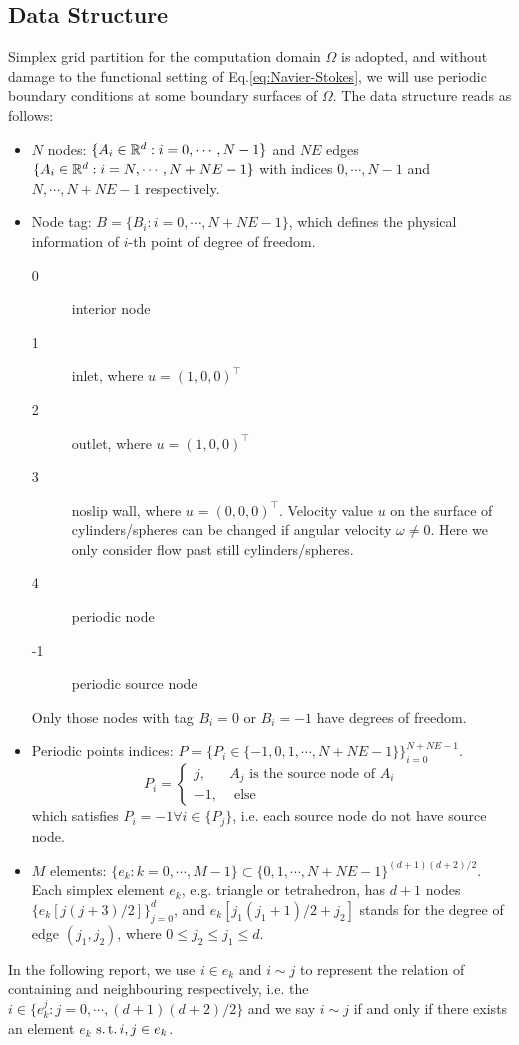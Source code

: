 \subsection{Data Structure}
Simplex grid partition for the computation domain $\Omega$ is adopted, 
and without damage to the functional setting of Eq.\eqref{eq:Navier-Stokes}, 
we will use periodic boundary conditions at some boundary surfaces of $\Omega$.
The data structure reads as follows:
\begin{itemize}
  \item $N$ nodes: $\{A_i\in\mathbb{R}^d:i=0,\cdots,N-1\}$ and 
    $NE$ edges $\{A_i\in\mathbb{R}^d:i=N,\cdots,N+NE-1\}$ 
    with indices $0,\cdots,N-1$ and $N,\cdots,N+NE-1$ respectively.

  \item Node tag: $B=\{B_i:i=0,\cdots,N+NE-1\}$, which defines the physical information of $i$-th point of degree of freedom.
    \begin{description}
      \item[0] interior node
      \item[1] inlet, where $u=(1,0,0)^\top$
      \item[2] outlet, where $u=(1,0,0)^\top$
      \item[3] noslip wall, where $u=(0,0,0)^\top$. 
        Velocity value $u$ on the surface of cylinders/spheres can be changed 
        if angular velocity $\omega\neq0$. Here we only consider flow past still cylinders/spheres.
      \item[4] periodic node
      \item[-1] periodic source node
    \end{description}
    Only those nodes with tag $B_i=0$ or $B_i=-1$ have degrees of freedom.

  \item Periodic points indices: $P=\{P_i\in\{-1,0,1,\cdots,N+NE-1\}\}_{i=0}^{N+NE-1}$.
    \[
      P_i=\left\{\begin{array}{ll}
        j, & A_j \text{ is the source node of } A_i \\
        -1, & \text{ else }
      \end{array}\right.
      \]
    which satisfies $P_i=-1\forall i\in \{P_j\}$, 
    i.e. each source node do not have source node.

  \item $M$ elements: $\{e_k:k=0,\cdots,M-1\}\subset\{0,1,\cdots,N+NE-1\}^{(d+1)(d+2)/2}$. 
    Each simplex element $e_k$, e.g. triangle or tetrahedron, 
    has $d+1$ nodes $\{e_k[j(j+3)/2]\}_{j=0}^{d}$, 
    and $e_k[j_1(j_1+1)/2+j_2]$ stands for the degree of edge $(j_1,j_2)$, 
    where $0\leq j_2\leq j_1\leq d$.

\end{itemize}
In the following report, we use $i\in e_k$ and $i\sim j$ to represent the 
relation of containing and neighbouring respectively, i.e.
the $i\in\{e_k^j:j=0,\cdots,(d+1)(d+2)/2\}$ and 
we say $i\sim j$ if and only if there exists an element $e_k$ $\operatorname*{s.t.} i,j\in e_k$.

